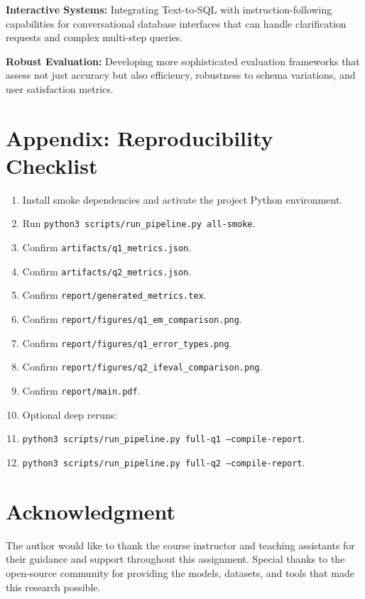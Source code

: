 \documentclass[conference]{IEEEtran}
\begin{document}
\textbf{Interactive Systems:} Integrating Text-to-SQL with instruction-following capabilities for conversational database interfaces that can handle clarification requests and complex multi-step queries.

\textbf{Robust Evaluation:} Developing more sophisticated evaluation frameworks that assess not just accuracy but also efficiency, robustness to schema variations, and user satisfaction metrics.

\section{Appendix: Reproducibility Checklist}
\begin{enumerate}
    \item Install smoke dependencies and activate the project Python environment.
    \item Run \texttt{python3 scripts/run\_pipeline.py all-smoke}.
    \item Confirm \texttt{artifacts/q1\_metrics.json}.
    \item Confirm \texttt{artifacts/q2\_metrics.json}.
    \item Confirm \texttt{report/generated\_metrics.tex}.
    \item Confirm \texttt{report/figures/q1\_em\_comparison.png}.
    \item Confirm \texttt{report/figures/q1\_error\_types.png}.
    \item Confirm \texttt{report/figures/q2\_ifeval\_comparison.png}.
    \item Confirm \texttt{report/main.pdf}.
    \item Optional deep reruns:
    \item \texttt{python3 scripts/run\_pipeline.py full-q1 --compile-report}.
    \item \texttt{python3 scripts/run\_pipeline.py full-q2 --compile-report}.
\end{enumerate}

\section*{Acknowledgment}
The author would like to thank the course instructor and teaching assistants for their guidance and support throughout this assignment. Special thanks to the open-source community for providing the models, datasets, and tools that made this research possible.
\end{document}
